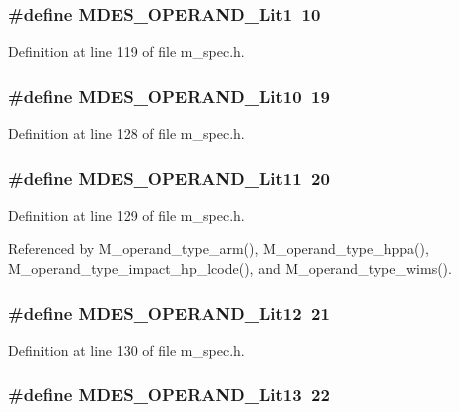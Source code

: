 \subsubsection{\setlength{\rightskip}{0pt plus 5cm}\#define MDES\_\-OPERAND\_\-Lit1~10}\label{m__spec_8h_2e6bd08f691fc6a02ba33342ff6fde8f}




Definition at line 119 of file m\_\-spec.h.
\subsubsection{\setlength{\rightskip}{0pt plus 5cm}\#define MDES\_\-OPERAND\_\-Lit10~19}\label{m__spec_8h_a3f979e6403fcf192713d5bc01c791ac}




Definition at line 128 of file m\_\-spec.h.
\subsubsection{\setlength{\rightskip}{0pt plus 5cm}\#define MDES\_\-OPERAND\_\-Lit11~20}\label{m__spec_8h_c85a5e9c80784ffe9b383c76d824b988}




Definition at line 129 of file m\_\-spec.h.

Referenced by M\_\-operand\_\-type\_\-arm(), M\_\-operand\_\-type\_\-hppa(), M\_\-operand\_\-type\_\-impact\_\-hp\_\-lcode(), and M\_\-operand\_\-type\_\-wims().
\subsubsection{\setlength{\rightskip}{0pt plus 5cm}\#define MDES\_\-OPERAND\_\-Lit12~21}\label{m__spec_8h_dce941c76deeab450e91949e5c886e58}




Definition at line 130 of file m\_\-spec.h.
\subsubsection{\setlength{\rightskip}{0pt plus 5cm}\#define MDES\_\-OPERAND\_\-Lit13~22}\label{m__spec_8h_bb1f355f9610714c7c12362bbb83f6ed}




